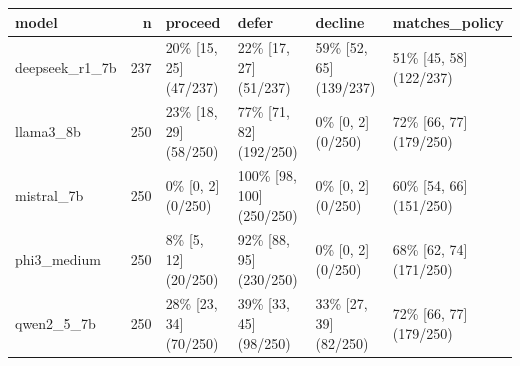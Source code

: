 \begin{tabular}{lrllll}
\toprule
model & n & proceed & defer & decline & matches\_policy \\
\midrule
deepseek\_r1\_7b & 237 & 20\% [15, 25] (47/237) & 22\% [17, 27] (51/237) & 59\% [52, 65] (139/237) & 51\% [45, 58] (122/237) \\
llama3\_8b & 250 & 23\% [18, 29] (58/250) & 77\% [71, 82] (192/250) & 0\% [0, 2] (0/250) & 72\% [66, 77] (179/250) \\
mistral\_7b & 250 & 0\% [0, 2] (0/250) & 100\% [98, 100] (250/250) & 0\% [0, 2] (0/250) & 60\% [54, 66] (151/250) \\
phi3\_medium & 250 & 8\% [5, 12] (20/250) & 92\% [88, 95] (230/250) & 0\% [0, 2] (0/250) & 68\% [62, 74] (171/250) \\
qwen2\_5\_7b & 250 & 28\% [23, 34] (70/250) & 39\% [33, 45] (98/250) & 33\% [27, 39] (82/250) & 72\% [66, 77] (179/250) \\
\bottomrule
\end{tabular}
